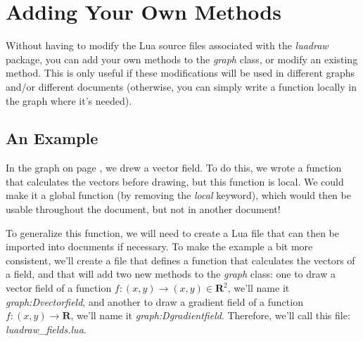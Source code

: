 \section{Adding Your Own Methods}

Without having to modify the Lua source files associated with the \emph{luadraw} package, you can add your own methods to the \emph{graph} class, or modify an existing method. This is only useful if these modifications will be used in different graphs and/or different documents (otherwise, you can simply write a function locally in the graph where it's needed).

\subsection{An Example}
In the graph on page \pageref{field}, we drew a vector field. To do this, we wrote a function that calculates the vectors before drawing, but this function is local. We could make it a global function (by removing the \emph{local} keyword), which would then be usable throughout the document, but not in another document!

To generalize this function, we will need to create a Lua file that can then be imported into documents if necessary. To make the example a bit more consistent, we'll create a file that defines a function that calculates the vectors of a field, and that will add two new methods to the \emph{graph} class: one to draw a vector field of a function $f\colon(x,y)\to(x,y)\in \mathbf R^2$, we'll name it \emph{graph:Dvectorfield}, and another to draw a gradient field of a function $f\colon(x,y)\to\mathbf R$, we'll name it \emph{graph:Dgradientfield}. Therefore, we'll call this file: \emph{luadraw\_fields.lua}.

